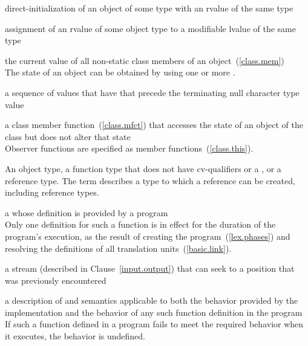 %
direct-initialization of an object of some type with an rvalue of the same type

%
assignment of an rvalue of some object type to a modifiable lvalue of the same type

%
the current value of all non-static class members of an object~(\ref{class.mem})\\
\enternote
The state of an object can be obtained by using one or more
.
\exitnote

%
%
a sequence of values that have
that precede the terminating null character type
value

%
a class member function~(\ref{class.mfct}) that accesses the state of an object of the class 
but does not alter that state\\
\enternote
Observer functions are specified as
member functions~(\ref{class.this}).
\exitnote

An object type, a function type that does not have cv-qualifiers or a
, or a reference type.
\enternote The term describes a type to which a reference can be created,
including reference types. \exitnote

%
a
whose definition is provided by a \Cpp program\\
\enternote
Only one definition for such a function is in effect for the duration of the program's
execution, as the result of creating the program~(\ref{lex.phases}) and resolving the
definitions of all translation units~(\ref{basic.link}).
\exitnote

%
a stream (described in Clause~\ref{input.output}) that can seek to a position that was
previously encountered

%
a description of
and
semantics
applicable to both the behavior provided by the implementation and
the behavior of any such function definition in the program\\
\enternote
If such a function defined in a \Cpp program fails to meet the required
behavior when it executes, the behavior is undefined.%
\exitnote

